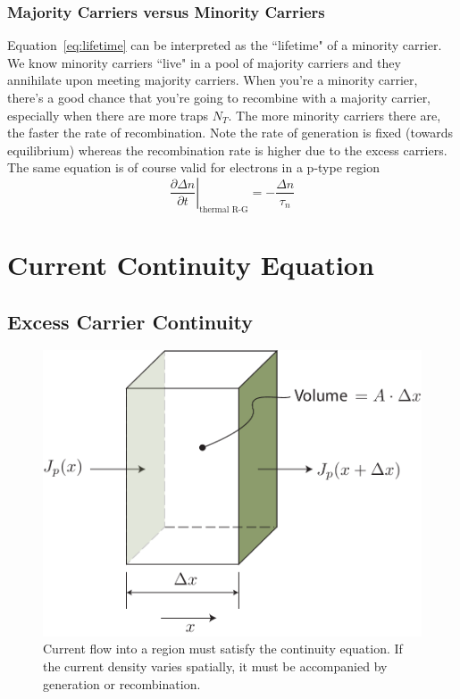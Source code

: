 \subsubsection*{Majority Carriers versus Minority Carriers}
Equation~\ref{eq:lifetime} can be interpreted as the ``lifetime" of a minority carrier.  We know minority carriers ``live" in a pool of majority carriers and they annihilate upon meeting majority carriers.  When you're a minority carrier, there's a good chance that you're going to recombine with a majority carrier, especially when there are more traps $N_T$.  The more minority carriers there are, the faster the rate of recombination.  Note the rate of generation is fixed (towards equilibrium) whereas the recombination rate is higher due to the excess carriers.  The same equation is of course valid for electrons in a p-type region
\begin{equation}
	\left. \frac{\partial \Delta n}{\partial t} \right|_{\text{thermal R-G}} = - \frac{\Delta n}{\tau_n}
\end{equation}
\section{Current Continuity Equation}
\subsection{Excess Carrier Continuity}
\begin{figure}[tb]
\begin{center}
\includegraphics[width=.65\columnwidth]{Jbox}
\end{center}
\caption{Current flow into a region must satisfy the continuity equation.  If the current density varies spatially, it must be accompanied by generation or recombination.}
\label{fig:Jbox}
\end{figure}

